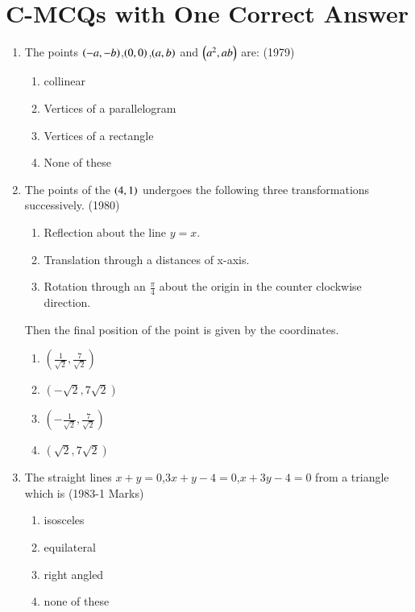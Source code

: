 \documentclass[journal,12pt,twocolumn]{IEEEtran}
\theoremstyle{remark}
\begin{document}
\section {C-MCQs with One Correct Answer}
\begin{enumerate}
	\item The points $\left(-a,-b\right)$,$\left(0,0\right)$,$\left(a,b\right)$ and $\left(a^2,ab\right)$ are:
    \hfill(1979)
    \begin{enumerate}
        \item collinear
        \item Vertices of a parallelogram
        \item Vertices of a rectangle 
        \item None of these
    \end{enumerate}
    \item The points of the $\left(4,1\right)$ undergoes the following three transformations successively.
    \hfill(1980)
    \begin{enumerate}
        \item Reflection about the line $y=x$.
        \item Translation through a distances of x-axis.
        \item Rotation through an $\frac{\pi}{4}$ about the origin in the counter clockwise direction.
    \end{enumerate}
    Then the final position of the point is given by the coordinates.
    \begin{multicols}{2} 		
    \begin{enumerate}
        \item $\left(\frac{1}{\sqrt{2}},\frac{7}{\sqrt{2}} \right)$
        \item $(-\sqrt{2},7\sqrt{2})$
        \item $\left(-\frac{1}{\sqrt{2}},\frac{7}{\sqrt{2}} \right)$
        \item $(\sqrt{2},7\sqrt{2})$
    \end{enumerate} 
    \end{multicols}	    
    \item The straight lines $x+y=0$,$3x+y-4=0$,$x+3y-4=0$ from a triangle which is 
    \hfill(1983-1 Marks)
    \begin{multicols}{2}	
    \begin{enumerate}
        \item isosceles
        \item equilateral 
        \item right angled
        \item none of these

\end{enumerate}
\end{multicols}
\end{enumerate}
\end{document}

